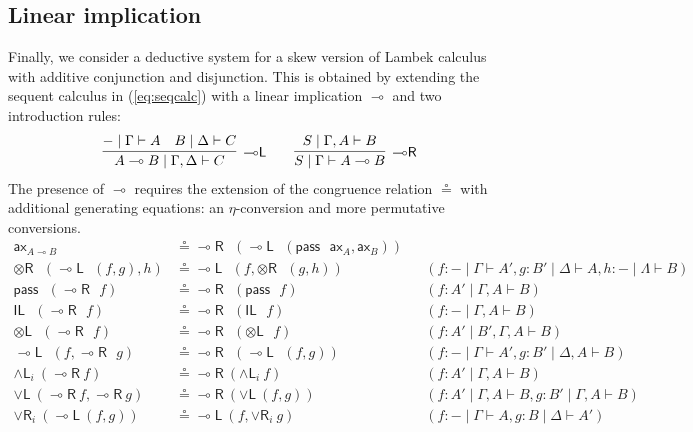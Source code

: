 \documentclass[submission,copyright,creativecommons]{eptcs}
\theoremstyle{definition}
\newcommand{\tl}{\otimes \mathsf{L}}
\newcommand{\tr}{\otimes \mathsf{R}}
\newcommand{\lright}{{\multimap}\mathsf{R}}
\newcommand{\lleft}{{\multimap}\mathsf{L}}
\newcommand{\pass}{\mathsf{pass}}
\newcommand{\unitl}{\mathsf{IL}}
\newcommand{\andli}{\land \mathsf{L}_{i}}
\newcommand{\orl}{\lor \mathsf{L}}
\newcommand{\orri}{\lor \mathsf{R}_{i}}
\newcommand{\ax}{\mathsf{ax}}
\newcommand{\lolli}{\multimap}
\begin{document}
\subsection{Linear implication}\label{subsec:impl}
Finally, we consider a deductive system for a skew version of Lambek calculus with additive conjunction and disjunction.
This is obtained by extending the sequent calculus in (\ref{eq:seqcalc}) with a linear implication $\lolli$ and two introduction rules:
\begin{displaymath}
  \begin{array}{c}
    \infer[\lleft]{A \lolli B \mid \Gamma , \Delta \vdash C}{
      - \mid \Gamma \vdash A
      &
      B \mid \Delta \vdash C
    }
    \qquad
    \infer[\lright]{S \mid \Gamma \vdash A \lolli B}{S \mid \Gamma , A \vdash B}
  \end{array}
\end{displaymath}
The presence of $\lolli$ requires the extension of the congruence relation $\circeq$ with additional generating equations: an $\eta$-conversion and more permutative conversions.
\begin{equation*}\label{fig:circeq:impl}
  \begin{array}{rlll}
  \ax_{A \lolli B} &\circeq \lright \text{ } (\lleft \text{ } (\pass \text{ } \ax_{A}, \ax_{B} ))
  \\
  \tr \text{ } (\lleft \text{ } (f , g), h) & \circeq \lleft \text{ } (f, \tr \text{ } (g, h)) &&(f: {-} \mid \Gamma \vdash A', g : B' \mid \Delta \vdash A, h : {-} \mid \Lambda \vdash B)
  \\
  \pass \text{ } (\lright \text{ } f) &\circeq  \lright \text{ } (\pass \text{ } f) &&(f : A' \mid \Gamma , A \vdash B)
  \\
  \unitl \text{ } (\lright \text{ } f) &\circeq \lright \text{ } (\unitl \text{ } f) &&(f : {-} \mid \Gamma , A \vdash B)
  \\
  \tl \text{ } (\lright \text{ } f) &\circeq \lright \text{ } (\tl \text{ } f) &&(f : A' \mid B' , \Gamma , A \vdash B)
  \\
  \lleft \text{ } (f, \lright \text{ } g) &\circeq \lright \text{ } (\lleft \text{ } (f, g)) &&(f : {-} \mid \Gamma \vdash A', g : B' \mid \Delta , A \vdash B)
  \\
  \andli \ (\lright \ f) &\circeq \lright \ (\andli \ f) &&(f : A' \mid \Gamma , A \vdash B)
  \\
  \orl \ (\lright \ f , \lright \ g) &\circeq \lright \ (\orl \ (f ,g)) &&(f : A' \mid \Gamma , A \vdash B , g : B' \mid \Gamma , A \vdash B)
  \\
  \orri \ (\lleft \  (f , g)) &\circeq \lleft \ (f , \orri \ g) &&(f : - \mid \Gamma \vdash A , g : B \mid \Delta \vdash A')
  \end{array}
\end{equation*}
\end{document}
